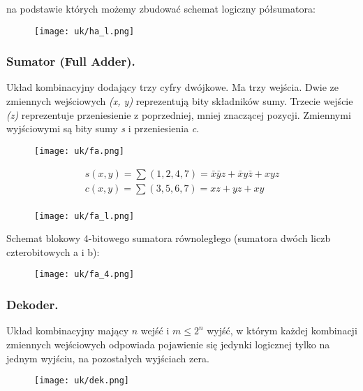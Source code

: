 \documentclass[main.tex]{subfiles}
\begin{document}
    na podstawie których możemy zbudować schemat logiczny półsumatora:

    \begin{figure}[H]
        \texttt{[image: uk/ha\_l.png]}
    \end{figure}

    \subsubsection{Sumator (Full Adder).}
    Układ kombinacyjny dodający trzy cyfry dwójkowe. Ma trzy wejścia. Dwie ze zmiennych wejściowych \textit{(x, y)}
    reprezentują bity składników sumy. Trzecie wejście \textit{(z)} reprezentuje przeniesienie z poprzedniej, mniej
    znaczącej pozycji. Zmiennymi wyjściowymi są bity sumy \textit{s} i przeniesienia \textit{c}.

    \begin{figure}[H]
        \texttt{[image: uk/fa.png]}
    \end{figure}

    \begin{gather*}
        s(x,y) = \sum (1,2,4,7) = \bar{x}\bar{y}z + \bar{x}y\bar{z} + xyz\\
        c(x,y) = \sum (3,5,6,7) = xz + yz + xy\\
    \end{gather*}

    \begin{figure}[H]
        \texttt{[image: uk/fa\_l.png]}
    \end{figure}

    Schemat blokowy 4-bitowego sumatora równoległego (sumatora dwóch liczb czterobitowych a i b):

    \begin{figure}[H]
        \texttt{[image: uk/fa\_4.png]}
    \end{figure}

    \subsubsection{Dekoder.}
    Układ kombinacyjny mający $n$ wejść i $m \leq 2^n$ wyjść, w którym każdej kombinacji zmiennych wejściowych
    odpowiada pojawienie się jedynki logicznej tylko na jednym wyjściu, na pozostałych wyjściach zera.

    \begin{figure}[H]
        \texttt{[image: uk/dek.png]}
    \end{figure}
\end{document}
